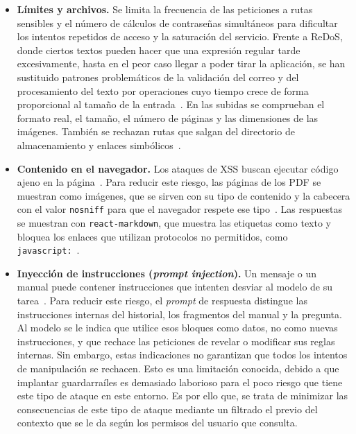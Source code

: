 \begin{itemize}
    \item \textbf{Límites y archivos.} Se limita la frecuencia de las
    peticiones a rutas sensibles y el número de cálculos de contraseñas
    simultáneos para dificultar los intentos repetidos de acceso y la
    saturación del servicio. Frente a \ac{ReDoS}, donde ciertos textos
    pueden hacer que una expresión regular tarde excesivamente, hasta en el
    peor caso llegar a poder tirar la aplicación, se
    han sustituido patrones problemáticos de la validación del correo y del
    procesamiento del texto por operaciones cuyo tiempo crece de forma
    proporcional al tamaño de la entrada~\cite{owasp_input_validation}.
    En las subidas se comprueban el formato real,
    el tamaño, el número de páginas y las dimensiones de las imágenes.
    También se rechazan rutas que salgan del directorio de almacenamiento
    y enlaces simbólicos~\cite{owasp_file_upload}.

    \item \textbf{Contenido en el navegador.} Los ataques de \ac{XSS}
    buscan ejecutar código ajeno en la página~\cite{mdn_xss}. Para reducir
    este riesgo, las páginas de los \acs{PDF} se muestran como imágenes,
    que se sirven con su tipo de contenido y la cabecera
     con el valor \texttt{nosniff} para que el navegador respete
    ese tipo~\cite{mdn_nosniff}. Las respuestas se muestran con
    \texttt{react-markdown}, que muestra las etiquetas como texto y bloquea los enlaces
    que utilizan protocolos no permitidos, como \texttt{javascript:}~\cite{react_markdown_security}.

    \item \textbf{Inyección de instrucciones (\textit{prompt injection}).}
    Un mensaje o un manual puede contener instrucciones que intenten desviar
    al modelo de su tarea~\cite{anthropic_prompt_injection}. Para reducir
    este riesgo, el \textit{prompt} de respuesta distingue las instrucciones
    internas del historial, los fragmentos del manual y la pregunta.
    Al modelo se le indica que utilice esos bloques como datos, no como
    nuevas instrucciones, y que rechace las peticiones de revelar o modificar
    sus reglas internas. Sin embargo, estas indicaciones no garantizan que todos los
    intentos de manipulación se rechacen. Esto es una limitación conocida,
    debido a que implantar guardarraíles es demasiado laborioso para el
    poco riesgo que tiene este tipo de ataque en este entorno. Es por ello que,
    se trata de minimizar las consecuencias de este tipo de ataque mediante un
    filtrado el previo del contexto que se le da según los permisos del usuario que consulta.


\end{itemize}
